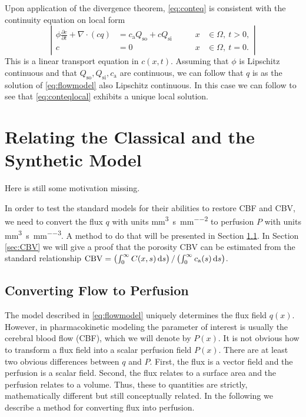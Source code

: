 \documentclass[paper=a4, fontsize=11pt,parskip=half,headings=small]{scrartcl}
\newcommand{\Qso}{Q_{\mathrm{so}}}
\newcommand{\Qsi}{Q_{\mathrm{si}}}
\newcommand{\ca}{c_\mathrm{a}}
\newcommand{\CBV}{\mathrm{CBV}}
\newcommand{\siq}{\cubic\milli\meter\per\second\per\square\milli\meter}
\newcommand{\siP}{\cubic\milli\meter\per\second\per\cubic\milli\meter}
\begin{document}
	Upon application of the divergence theorem, \eqref{eq:conteq} is consistent with the continuity equation on local form
	\begin{equation}
		\left\vert
		\begin{alignedat}{2}
			\phi \frac{\partial c}{\partial t} + \nabla \cdot (cq) &= \ca\Qso + c\Qsi \qquad	&x &\in \Omega, \ t>0,  \\
			c &= 0 																			 	&x &\in \Omega, \ t=0.
		\end{alignedat}
		\right\vert
		\label{eq:conteqlocal}
	\end{equation}
	This is a linear transport equation in $c(x,t)$. 
	Assuming that $\phi$ is Lipschitz continuous and that $\Qso,\Qsi,\ca$ are continuous, we can follow that $q$ is as the solution of \eqref{eq:flowmodel} also Lipschitz continuous.
	In this case we can follow \cite{evans98} to see that \eqref{eq:conteqlocal} exhibits a unique local solution.
	


	\section{Relating the Classical and the Synthetic Model}\label{sec:relation}
	Here is still some motivation missing.
	
	In order to test the standard models for their abilities to restore CBF and CBV, we need to convert the flux $q$ with units \si{\siq} to perfusion $P$ with units \si{\siP}. 
	A method to do that will be presented in Section \ref{sec:flux2perf}.
	In Section \ref{sec:CBV} we will give a proof that the porosity CBV can be estimated from the standard relationship $\CBV = \left(\int_0^\infty C(x,s) \diffint s\right)/\left(\int_0^\infty \ca(s) \diffint s\right)$.
	
	
	
	\subsection{Converting Flow to Perfusion}\label{sec:flux2perf}
	The model described in \eqref{eq:flowmodel} uniquely determines the flux field $q(x)$. 
	However, in pharmacokinetic modeling the parameter of interest is usually the cerebral blood flow (CBF), which we will denote by $P(x)$.
	It is not obvious how to transform a flux field into a scalar perfusion field $P(x)$.
	There are at least two obvious differences between $q$ and $P$. 
	First, the flux is a vector field and the perfusion is a scalar field. 
	Second, the flux relates to a surface area and the perfusion relates to a volume. 
	Thus, these to quantities are strictly, mathematically different but still conceptually related. 
	In the following we describe a method for converting flux into perfusion.
\end{document}
